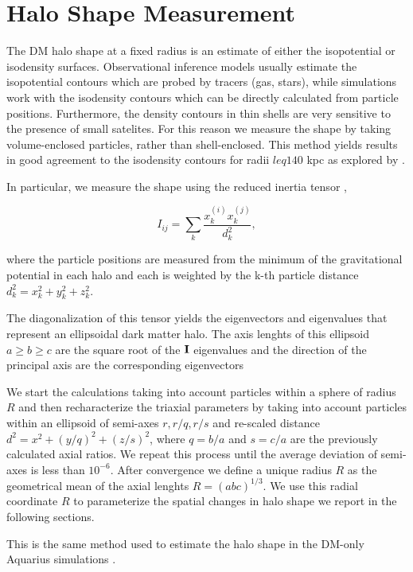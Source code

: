 \documentclass[a4paper,fleqn,usenatbib]{mnras}
\begin{document}
\section{Halo Shape Measurement}
\label{sec:method}

The DM halo shape at a fixed radius is an estimate of either
the isopotential or isodensity surfaces.  
Observational inference models usually estimate the 
isopotential contours which are probed by tracers (gas, stars), while
simulations work with the isodensity contours which can be directly
calculated from particle positions.  
Furthermore, the density contours in thin shells are very sensitive to
the presence of small satelites.  
For this reason we measure the shape by taking
volume-enclosed particles, rather than shell-enclosed.  
This method yields results in good agreement to the isodensity
contours for radii $leq 140$ kpc as explored by
\citep{VeraCiro11}.  


In particular, we measure the shape using the reduced inertia tensor
\citep{Allgood_et_al._2006},  

\begin{equation}
I_{ij} = \sum_k \frac{x_k^{(i)}x_k^{(j)}}{d^2_k},
\label{eq:inertia}
\end{equation}

where the particle positions are measured from the minimum of the
gravitational potential in each halo and each is weighted by the k-th
particle distance 
$d_k^2=x_k^2+y_k^2+z_k^2$.

The diagonalization of this tensor yields the eigenvectors and
eigenvalues that represent an ellipsoidal dark matter halo.
The axis lenghts of this ellipsoid $a\geq b \geq c$ are the square
root of the ${\bf I}$ eigenvalues and the direction of the principal
axis are the corresponding eigenvectors 

We start the calculations taking into account particles within a
sphere of radius $R$ and then recharacterize the triaxial parameters
by taking into account particles within an ellipsoid of semi-axes
$r,r/q,r/s$ and re-scaled distance $d^2=x^2+(y/q)^2+(z/s)^2$, where $q
= b/a$ and $s=c/a$ are the previously calculated axial ratios. 
We repeat this process until the average deviation of semi-axes is
less than $10^{-6}$.  
After convergence we define a unique radius $R$ as the geometrical
mean of the axial lenghts $R=(abc)^{1/3}$.
We use this radial coordinate $R$ to parameterize the spatial changes
in halo shape we report in the following sections.

This is the same method used to estimate the halo shape in the DM-only
Aquarius simulations \citep{VeraCiro11}. 
\end{document}
